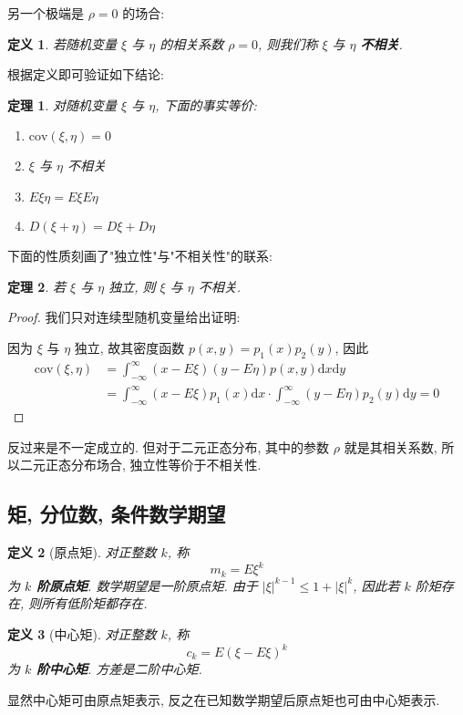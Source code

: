\documentclass[12pt,a4paper]{article}
\newtheorem{thm}{定理}[subsection]  %
\newtheorem{definition}{定义}[subsection] %
\begin{document}
另一个极端是 $\rho = 0$ 的场合:
\begin{definition}
    若随机变量 $\xi$ 与 $\eta$ 的相关系数 $\rho = 0$, 则我们称 $\xi$ 与 $\eta$ \textbf{不相关}.
\end{definition}
根据定义即可验证如下结论:
\begin{thm}
    对随机变量 $\xi$ 与 $\eta$, 下面的事实等价:
    \begin{enumerate}[label=(\roman*),font=\upshape]
        \item $\mathrm{cov}(\xi, \eta) = 0$
        \item $\xi$ 与 $\eta$ 不相关
        \item $E\xi\eta = E\xi E\eta$
        \item $D(\xi+\eta) = D\xi + D\eta$
    \end{enumerate}
\end{thm}
下面的性质刻画了"独立性"与"不相关性"的联系:
\begin{thm}
    若 $\xi$ 与 $\eta$ 独立, 则 $\xi$ 与 $\eta$ 不相关.
\end{thm}
\begin{proof}
    我们只对连续型随机变量给出证明:

    因为 $\xi$ 与 $\eta$ 独立, 故其密度函数 $p(x,y) = p_1(x)p_2(y)$, 因此
    \[\begin{aligned}
        \mathrm{cov}(\xi,\eta) & = \int_{-\infty}^{\infty} (x-E\xi)(y-E\eta)p(x,y) \mathrm{d}x\mathrm{d}y \\
        & = \int_{-\infty}^{\infty} (x-E\xi)p_1(x) \mathrm{d}x \cdot \int_{-\infty}^{\infty} (y - E\eta)p_2(y) \mathrm{d}y = 0
    \end{aligned}\]
\end{proof}
反过来是不一定成立的. 但对于二元正态分布, 其中的参数 $\rho$ 就是其相关系数, 所以二元正态分布场合, 独立性等价于不相关性.

\subsection{矩, 分位数, 条件数学期望}

\begin{definition}[原点矩]
    对正整数 $k$, 称 \[m_k = E \xi^k\] 为\textbf{ $k$ 阶原点矩}. 数学期望是一阶原点矩. 由于 $|\xi|^{k-1} \leq 1 + |\xi|^k$, 
    因此若 $k$ 阶矩存在, 则所有低阶矩都存在.
\end{definition}

\begin{definition}[中心矩]
    对正整数 $k$, 称 \[c_k = E(\xi - E\xi)^k\] 为 \textbf{$k$ 阶中心矩}. 方差是二阶中心矩.
\end{definition}
显然中心矩可由原点矩表示, 反之在已知数学期望后原点矩也可由中心矩表示.
\end{document}
